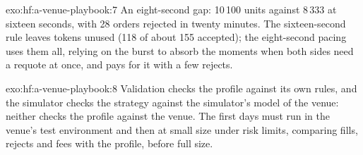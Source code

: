 \begin{solution}{exo:hf:a-venue-playbook:7}
An eight-second gap: 10\,100 units against 8\,333 at sixteen seconds, with 28 orders rejected in twenty minutes. The sixteen-second rule leaves
tokens unused (118 of about 155 accepted); the eight-second pacing uses them all, relying on the burst to absorb the moments when both sides
need a requote at once, and pays for it with a few rejects.
\end{solution}

\begin{solution}{exo:hf:a-venue-playbook:8}
Validation checks the profile against its own rules, and the simulator checks the strategy against the simulator's model of the venue: neither
checks the profile against the venue. The first days must run in the venue's test environment and then at small size under risk limits, comparing
fills, rejects and fees with the profile, before full size.
\end{solution}

